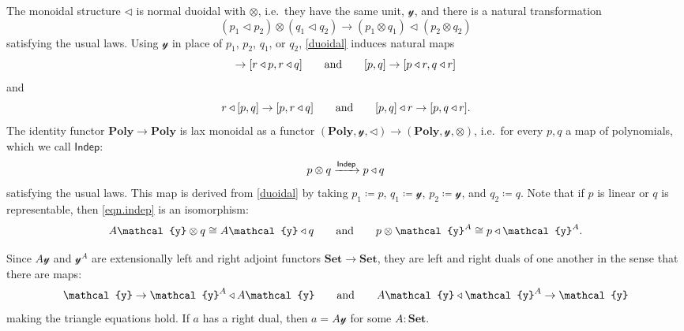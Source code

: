 \documentclass[11pt, one side, article]{memoir}
\theoremstyle{definition}
\theoremstyle{plain}
\newcommand{\Cat}[1]{\mathbf{#1}}%
\newcommand{\Fun}[1]{\mathsf{#1}}%
\newcommand{\too}{\longrightarrow}
\newcommand{\To}[2][]{\xrightarrow[#1]{\tn{$#2$}}}
\newcommand{\tn}[1]{\textnormal{#1}}
\newcommand{\smset}{\Cat{Set}}
\newcommand{\yon}{{\mathcal{y}}}
\newcommand{\poly}{\Cat{Poly}}
\newcommand{\0}{\textsf{0}}
\newcommand{\1}{\tn{\textsf{1}}}
\newcommand{\tri}{\mathbin{\triangleleft}}
\newcommand{\indep}{\Fun{Indep}}
\newcommand{\hh}[2][]{#1 \tn{#2} #1}
\newcommand{\qqand}{\hh[\qquad]{and}}
\begin{document}
The monoidal structure $\tri$ is normal duoidal with $\otimes$, i.e.\ they have the same unit, $\yon$, and there is a natural transformation
\begin{equation}\label{duoidal}
	(p_1\tri p_2)\otimes(q_1\tri q_2)\too(p_1\otimes q_1)\tri(p_2\otimes q_2)
\end{equation}
satisfying the usual laws. Using $\yon$ in place of $p_1$, $p_2$, $q_1$, or $q_2$, \eqref{duoidal} induces natural maps
\begin{equation}
	[p,q]\to[r\tri p, r\tri q]
	\qqand
	[p,q]\to[p\tri r, q\tri r]
\end{equation}
and
\begin{equation}
	r\tri[p,q]\to[p,r\tri q]
	\qqand
	[p,q]\tri r\to [p,q\tri r].
\end{equation}
The identity functor $\poly\to\poly$ is lax monoidal as a functor $(\poly,\yon,\tri)\to(\poly,\yon,\otimes)$, i.e.\ for every $p,q$ a map of polynomials, which we call $\indep$:
\begin{equation}\label{eqn.indep}
	p\otimes q\To{\indep} p\tri q
\end{equation}
satisfying the usual laws. This map is derived from \eqref{duoidal} by taking $p_1\coloneqq p$, $q_1\coloneqq\yon$, $p_2\coloneqq\yon$, and $q_2\coloneqq q$. Note that if $p$ is linear or $q$ is representable, then \eqref{eqn.indep} is an isomorphism:
\begin{equation}
  A\yon\otimes q\cong A\yon\tri q
  \qqand
  p\otimes\yon^A\cong p\tri \yon^A.
\end{equation}

Since $A\yon$ and $\yon^A$ are extensionally left and right adjoint functors $\smset\to\smset$, they are left and right duals of one another in the sense that there are maps:
\begin{equation}
	\yon\to \yon^A\tri A\yon
	\qqand
	A\yon\tri\yon^A\to\yon
\end{equation}
making the triangle equations hold. If $a$ has a right dual, then $a=A\yon$ for some $A:\smset$.
\end{document}

